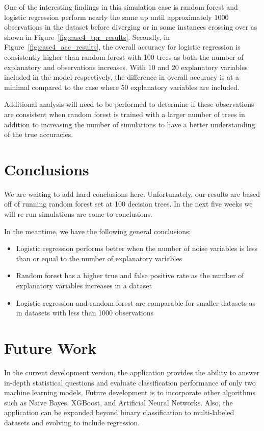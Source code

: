 \documentclass{llncs}
\begin{document}
One of the interesting findings in this simulation case is random forest and logistic regression perform nearly the same up until approximately 1000 observations in the dataset before diverging or in some instances crossing over as shown in Figure~\ref{fig:case4_tpr_results}. Secondly, in Figure~\ref{fig:case4_acc_results}, the overall accuracy for logistic regression is consistently higher than random forest with 100 trees as both the number of explanatory and observations increases. With 10 and 20 explanatory variables included in the model respectively, the difference in overall accuracy is at a minimal compared to the case where 50 explanatory variables are included. 

Additional analysis will need to be performed to determine if these observations are consistent when random forest is trained with a larger number of trees in addition to increasing the number of simulations to have a better understanding of the true accuracies.

\section{Conclusions}

We are waiting to add hard conclusions here.  Unfortunately, our results are based off of running random forest set at 100 decision trees.  In the next five weeks we will re-run simulations are come to conclusions.

In the meantime, we have the following general conclusions:
\begin{itemize}
  \item Logistic regression performs better when the number of noise variables is less than or equal to the number of explanatory variables
  \item Random forest has a higher true and false positive rate as the number of explanatory variables increases in a dataset
  \item Logistic regression and random forest are comparable for smaller datasets as in datasets with less than 1000 observations

\end{itemize}

\section{Future Work}

In the current development version, the application provides the ability to answer in-depth statistical questions and evaluate classification performance of only two machine learning models. Future development is to incorporate other algorithms such as Naive Bayes, XGBoost, and Artificial Neural Networks. Also, the application can be expanded beyond binary classification to multi-labeled datasets and evolving to include regression. 
\end{document}

